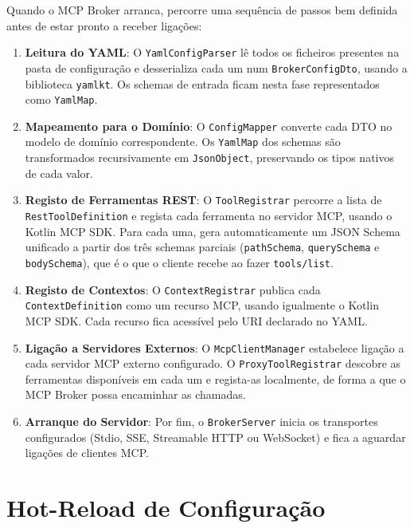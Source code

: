 Quando o MCP Broker arranca, percorre uma sequência de passos bem definida antes de estar pronto a receber ligações:

\begin{enumerate}
    \item \textbf{Leitura do YAML}: O \texttt{YamlConfigParser} lê todos os ficheiros presentes na pasta de configuração e desserializa cada um num \texttt{BrokerConfigDto}, usando a biblioteca \texttt{yamlkt}. Os schemas de entrada ficam nesta fase representados como \texttt{YamlMap}.

    \item \textbf{Mapeamento para o Domínio}: O \texttt{ConfigMapper} converte cada DTO no modelo de domínio correspondente. Os \texttt{YamlMap} dos schemas são transformados recursivamente em \texttt{JsonObject}, preservando os tipos nativos de cada valor.

    \item \textbf{Registo de Ferramentas REST}: O \texttt{ToolRegistrar} percorre a lista de \texttt{RestToolDefinition} e regista cada ferramenta no servidor MCP, usando o Kotlin MCP SDK. Para cada uma, gera automaticamente um JSON Schema unificado a partir dos três schemas parciais (\texttt{pathSchema}, \texttt{querySchema} e \texttt{bodySchema}), que é o que o cliente recebe ao fazer \texttt{tools/list}.

    \item \textbf{Registo de Contextos}: O \texttt{ContextRegistrar} publica cada \texttt{ContextDefinition} como um recurso MCP, usando igualmente o Kotlin MCP SDK. Cada recurso fica acessível pelo URI declarado no YAML.

    \item \textbf{Ligação a Servidores Externos}: O \texttt{McpClientManager} estabelece ligação a cada servidor MCP externo configurado. O \texttt{ProxyToolRegistrar} descobre as ferramentas disponíveis em cada um e regista-as localmente, de forma a que o MCP Broker possa encaminhar as chamadas.

    \item \textbf{Arranque do Servidor}: Por fim, o \texttt{BrokerServer} inicia os transportes configurados (Stdio, SSE, Streamable HTTP ou WebSocket) e fica a aguardar ligações de clientes MCP.
\end{enumerate}


\section{Hot-Reload de Configuração}

